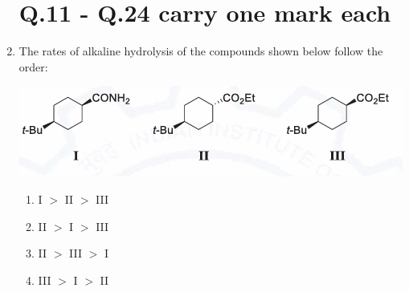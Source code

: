 \documentclass[journal,12pt,onecolumn]{IEEEtran}
\begin{document}
\begin{enumerate}
\section*{Q.11 - Q.24 carry one mark each}    
 \item The rates of alkaline hydrolysis of the compounds shown below follow the order: 
    \begin{center}
    \includegraphics[width=0.8\columnwidth]{figs/q11.png}
    \end{center}
    \begin{multicols}{2}
    \begin{enumerate}
        \item I $>$ II $>$ III
        \item II $>$ I $>$ III
        \item II $>$ III $>$ I
        \item III $>$ I $>$ II
    \end{enumerate}
    \end{multicols}
    \hfill{}


\end{enumerate}
\end{document}
